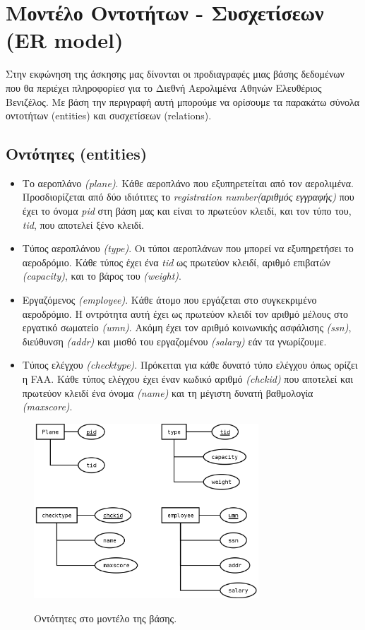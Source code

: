 \documentclass[a4paper]{article}
\begin{document}

\section{Μοντέλο Οντοτήτων - Συσχετίσεων (ER model)}
Στην εκφώνηση της άσκησης μας δίνονται οι προδιαγραφές μιας βάσης δεδομένων που θα περιέχει
πληροφορίεσ για το Διεθνή Αερολιμένα Αθηνών Ελευθέριος Βενιζέλος. Με βάση την
περιγραφή αυτή μπορούμε να ορίσουμε τα παρακάτω σύνολα οντοτήτων (entities)
και συσχετίσεων (relations).

\subsection{Οντότητες (entities)}
\begin{itemize}
\item Το αεροπλάνο \emph{(plane)}. Κάθε αεροπλάνο που εξυπηρετείται από τον αερολιμένα.
Προσδιορίζεται από δύο ιδιότιτες το \emph{registration number(αριθμός
εγγραφής)} που έχει το όνομα \emph{pid} στη βάση μας και είναι το πρωτεύον
κλειδί, και τον τύπο του, \emph{tid}, που αποτελεί ξένο κλειδί.
\item Τύπος αεροπλάνου \emph{(type)}. Οι τύποι αεροπλάνων που μπορεί να εξυπηρετήσει το
αεροδρόμιο. Κάθε τύπος έχει ένα \emph{tid} ως πρωτεύον κλειδί, αριθμό επιβατών
\emph{(capacity)}, και το βάρος του \emph{(weight)}.
\item Εργαζόμενος \emph{(employee)}. Κάθε άτομο που εργάζεται στο συγκεκριμένο αεροδρόμιο. Η
οντρότητα αυτή έχει ως πρωτεύον κλειδί τον αριθμό μέλους στο εργατικό
σωματείο \emph{(umn)}. Ακόμη έχει τον αριθμό κοινωνικής ασφάλισης \emph{(ssn)},
διεύθυνση \emph{(addr)} και μισθό του εργαζομένου \emph{(salary)} εάν τα γνωρίζουμε.
\item Τύπος ελέγχου \emph{(checktype)}. Πρόκειται για κάθε δυνατό τύπο ελέγχου όπως
ορίζει η FAA. Κάθε τύπος ελέγχου έχει έναν κωδικό αριθμό \emph{(chckid)} που
αποτελεί και πρωτεύον κλειδί ένα όνομα \emph{(name)} και τη μέγιστη δυνατή
βαθμολογία \emph{(maxscore)}.
\end{itemize}
\begin{figure}[h]
\centering
\includegraphics[width=0.75\textwidth]{../../ER_model/aviation_entities.png}\\
\caption{Οντότητες στο μοντέλο της βάσης.}
\end{figure}
\end{document}
